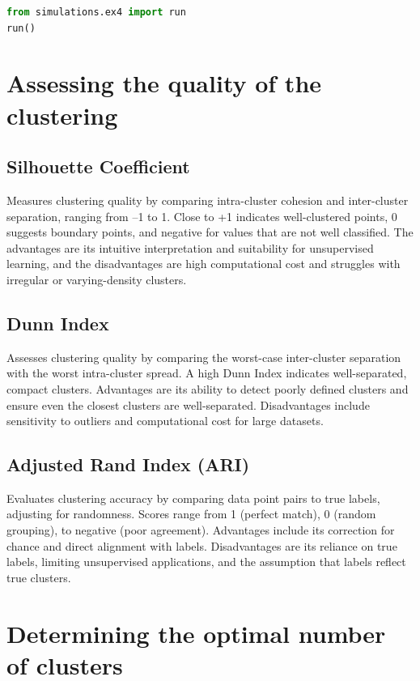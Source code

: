 \documentclass[11pt,a4paper]{article}
\begin{document}
\begin{lstlisting}[language=Python]
from simulations.ex4 import run
run()
\end{lstlisting}

\section{Assessing the quality of the clustering}

\subsection{Silhouette Coefficient}
Measures clustering quality by comparing intra-cluster cohesion and inter-cluster separation, ranging from --1 to 1. Close to +1 indicates well-clustered points, 0 suggests boundary points, and negative for values that are not well classified. The advantages are its intuitive interpretation and suitability for unsupervised learning, and the disadvantages are high computational cost and struggles with irregular or varying-density clusters.

\subsection{Dunn Index}
Assesses clustering quality by comparing the worst-case inter-cluster separation with the worst intra-cluster spread. A high Dunn Index indicates well-separated, compact clusters. Advantages are its ability to detect poorly defined clusters and ensure even the closest clusters are well-separated. Disadvantages include sensitivity to outliers and computational cost for large datasets.

\subsection{Adjusted Rand Index (ARI)}
Evaluates clustering accuracy by comparing data point pairs to true labels, adjusting for randomness. Scores range from 1 (perfect match), 0 (random grouping), to negative (poor agreement). Advantages include its correction for chance and direct alignment with labels. Disadvantages are its reliance on true labels, limiting unsupervised applications, and the assumption that labels reflect true clusters.

\section{Determining the optimal number of clusters}
\end{document}
